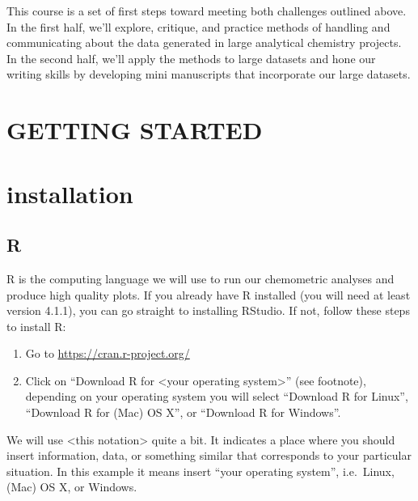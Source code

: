 \documentclass[
]{krantz}
\begin{document}
This course is a set of first steps toward meeting both challenges outlined above. In the first half, we'll explore, critique, and practice methods of handling and communicating about the data generated in large analytical chemistry projects. In the second half, we'll apply the methods to large datasets and hone our writing skills by developing mini manuscripts that incorporate our large datasets.

\hypertarget{section}{%
\section*{}\label{section}}

\hypertarget{getting-started}{%
\section*{GETTING STARTED}\label{getting-started}}

\hypertarget{installation}{%
\section{installation}\label{installation}}

\hypertarget{r}{%
\subsection{R}\label{r}}

R is the computing language we will use to run our chemometric analyses and produce high quality plots. If you already have R installed (you will need at least version 4.1.1), you can go straight to installing RStudio. If not, follow these steps to install R:

\begin{enumerate}
\def\labelenumi{\arabic{enumi}.}
\item
  Go to \url{https://cran.r-project.org/}
\item
  Click on ``Download R for \textless your operating system\textgreater{}'' (see footnote), depending on your operating system you will select ``Download R for Linux'', ``Download R for (Mac) OS X'', or ``Download R for Windows''.
\end{enumerate}

We will use \textless this notation\textgreater{} quite a bit. It indicates a place where you should insert information, data, or something similar that corresponds to your particular situation. In this example it means insert ``your operating system'', i.e.~Linux, (Mac) OS X, or Windows.
\end{document}
